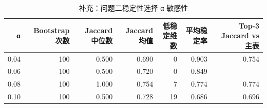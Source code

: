 \begin{table}[tbp]
\centering
\caption{补充：问题二稳定性选择 α 敏感性}
\label{tab:s07_q2_sensitivity}
\footnotesize
\setlength{\tabcolsep}{3.5pt}
\begin{tabular}{rrrrrrr}
\toprule
α & Bootstrap 次数 & Jaccard 中位数 & Jaccard 均值 & 低稳定维数 & 平均稳定率 & Top-3 Jaccard vs 主表 \\
\midrule
0.04 & 100 & 0.500 & 0.690 & 0 & 0.903 & 0.754 \\
0.06 & 100 & 0.500 & 0.720 & 0 & 0.849 &  \\
0.08 & 100 & 1.000 & 0.754 & 7 & 0.774 & 0.774 \\
0.10 & 100 & 0.500 & 0.728 & 19 & 0.686 & 0.696 \\
\bottomrule
\end{tabular}
\end{table}

